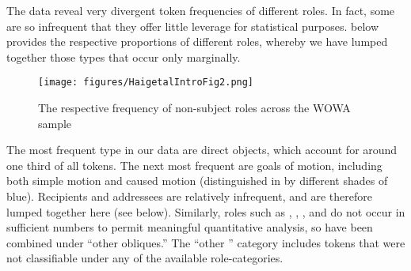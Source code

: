 \documentclass[output=paper,colorlinks,citecolor=brown,collectionchapter]{langscibook}
\begin{document}

The data reveal very divergent token frequencies of different roles. In fact, some are so infrequent that they offer little leverage for statistical purposes.  below provides the respective proportions of different roles, whereby we have lumped together those  types that occur only marginally.

\begin{figure}
    \texttt{[image: figures/HaigetalIntroFig2.png]}
    \caption{The respective frequency of non-subject roles across the WOWA sample}
    \label{Intro:fig:2}
\end{figure}

The most frequent  type in our data are direct objects, which account for around one third of all tokens. The next most frequent are goals of motion, including both simple motion and caused motion (distinguished in  by different shades of blue). Recipients and addressees are relatively infrequent, and are therefore lumped together here (see below). Similarly, roles such as , , , and  do not occur in sufficient numbers to permit meaningful quantitative analysis, so have been combined under ``other obliques.'' The ``other '' category includes tokens that were not classifiable under any of the available role-categories.
\end{document}
